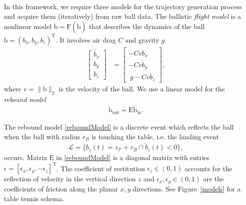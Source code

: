 \documentclass[letterpaper, 10 pt, conference]{ieeeconf}
\newcommand{\boldvec}[1]{\boldsymbol{\mathrm{#1}}}
\let\vec\boldvec
\newcommand{\ballFull}{\vec{x}_{B}} %
\newcommand{\ball}{\vec{b}} %
\newcommand{\ballRadius}{r_B}
\newcommand{\ballVel}{v}
\newcommand{\ballDynamics}{\vec{F}} %
\newcommand{\drag}{C} %
\newcommand{\gravity}{g}
\newcommand{\bounce}{\vec{E}}
\newcommand{\court}{\mathcal{T}} %
\newcommand{\landEvent}{\mathcal{L}} %
\begin{document}
In this framework, we require three models for the trajectory generation process and acquire them (iteratively) from raw ball data. The ballistic \emph{flight model} is a nonlinear model $\ddot{\ball} = \ballDynamics(\dot{\ball})$ that describes the dynamics of the ball $\ball = (b_x,b_y,b_z)^{\mathrm{T}}$. It involves air drag $\drag$ and gravity $\gravity$
%
\begin{align}
\ddot{\begin{bmatrix}
   b_x \\
   b_y \\
   b_z   
 \end{bmatrix}} &= 
 \begin{bmatrix}
 -\drag \ballVel \dot{b}_x  \\
 -\drag \ballVel \dot{b}_y  \\
 \ \gravity - \drag \ballVel \dot{b}_z 
 \end{bmatrix},
\label{flightModel}
\end{align}
%
\noindent where $\ballVel = \|\dot{\ball}\|_2$ is the velocity of the ball. We use a linear model for the \emph{rebound model}
%
\begin{align}
\dot{\ball}_{\mathrm{out}} = \bounce\dot{\ball}_{\mathrm{in}}.
\label{reboundModel}
\end{align}

\noindent The rebound model \eqref{reboundModel} is a discrete event which reflects the ball when the ball with radius $\ballRadius$ is touching the table, i.e. the landing event
%
\begin{align}
\landEvent = \{b_z(t) = z_{\court} + \ballRadius \cap \dot{b}_z(t) < 0\},
\label{landingEvent}
\end{align}
%
%
\noindent occurs. Matrix $\bounce$ in \eqref{reboundModel} is a diagonal matrix with entries $\vec{\epsilon} = [\epsilon_{x}, \epsilon_{y}, -\epsilon_{z}]^{\mathrm{T}}$. The coefficient of restitution $\epsilon_{z} \in (0,1)$ accounts for the reflection of velocity in the vertical direction $z$ and $\epsilon_{x}, \epsilon_{y} \in (0,1)$ are the coefficients of friction along the planar $x,y$ directions. See Figure~\ref{models} for a table tennis schema. 

\end{document}
